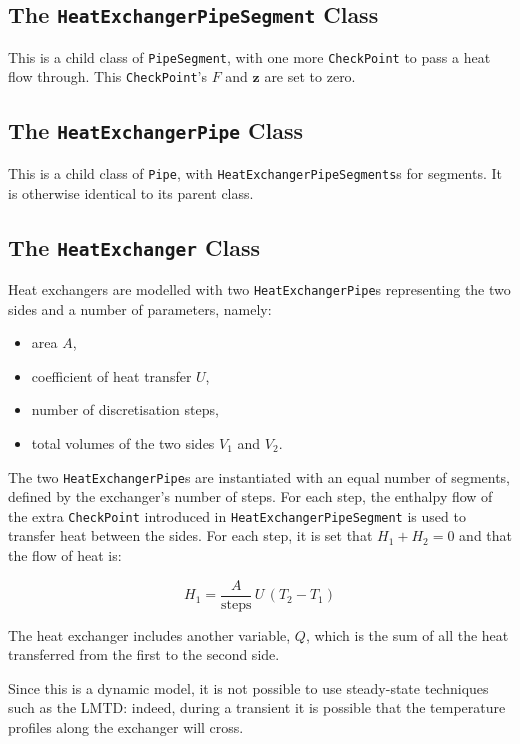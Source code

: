 \documentclass[a4paper]{article}
\begin{document}
\subsection{The \texttt{HeatExchangerPipeSegment} Class}
This is a child class of \texttt{PipeSegment}, with one more \texttt{CheckPoint}
to pass a heat flow through. This \texttt{CheckPoint}'s $F$ and $\mathbf{z}$ are
set to zero.


\subsection{The \texttt{HeatExchangerPipe} Class}
This is a child class of \texttt{Pipe}, with \texttt{HeatExchangerPipeSegments}s
for segments. It is otherwise identical to its parent class.


\subsection{The \texttt{HeatExchanger} Class}
Heat exchangers are modelled with two \texttt{HeatExchangerPipe}s representing
the two sides and a number of parameters, namely:

\begin{itemize}
\item area $A$,
\item coefficient of heat transfer $U$,
\item number of discretisation steps,
\item total volumes of the two sides $V_1$ and $V_2$.
\end{itemize}

The two \texttt{HeatExchangerPipe}s are instantiated with an equal number of
segments, defined by the exchanger's number of steps. For each step, the
enthalpy flow of the extra \texttt{CheckPoint} introduced in
\texttt{HeatExchangerPipeSegment} is used to transfer heat between the sides.
For each step, it is set that $H_1+H_2=0$ and that the flow of heat is:

\begin{equation}
H_1 = \frac{A}{\text{steps}}\,U\,(T_2-T_1)
\end{equation}

The heat exchanger includes another variable, $Q$, which is the sum of all the
heat transferred from the first to the second side.

Since this is a dynamic model, it is not possible to use steady-state techniques
such as the LMTD: indeed, during a transient it is possible that the temperature
profiles along the exchanger will cross.
\end{document}
